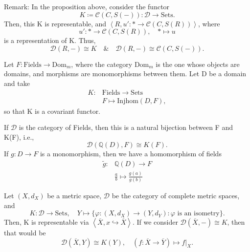 \documentclass[../category_theory.tex]{subfiles}
\begin{document}
Remark: In the proposition above, consider the functor
\[
	K\coloneqq \mathcal{C}(C, S(-)):\mathcal{D}\rightarrow \mathrm{Sets}.
\]
Then, this K is representable, and \(\left< R, u':*\rightarrow \mathcal{C}(C, S(R)) \right>\), where
\[
	u':*\rightarrow \mathcal{C}(C, S(R)),\quad *\mapsto u
\]
is a representation of K. Thus,
\[
	\mathcal{D}(R, -)\cong K \quad\&\quad \mathcal{D}(R, -)\cong \mathcal{C}(C, S(-)).
\]
\begin{example}
	Let \(F:\mathrm{Fields}\rightarrow \mathrm{Dom}_{m}\), where the category \(\mathrm{Dom}_{m}\) is the one whose objects are domains, and morphisms are monomorphisms between them. Let D be a domain and take
	\begin{align*}
		K: & \mathrm{Fields}\rightarrow \mathrm{Sets} \\
		   & F\mapsto \mathrm{Injhom}(D, F),
	\end{align*}
	so that K is a covariant functor.

	If \(\mathcal{D}\) is the category of Fields, then this is a natural bijection between F and K(F), i.e.,
	\[
		\mathcal{D}(\mathbb{Q}(D), F)\cong K(F).
	\]
	If \(g:D\rightarrow F\) is a monomorphism, then we have a homomorphism of fields
	\begin{align*}
		\tilde{g}: & \mathbb{Q}(D)\rightarrow F           \\
		           & \frac{a}{b}\mapsto \frac{g(a)}{g(b)}
	\end{align*}
\end{example}
\begin{example}
	Let \((X, d_X)\) be a metric space, \(\mathcal{D}\) be the category of complete metric spaces, and
	\[
		K:\mathcal{D}\rightarrow \mathrm{Sets},\quad Y\mapsto \{\varphi :(X, d_{X})\rightarrow (Y, d_{Y}): \varphi \text{ is an isometry}\}.
	\]
	Then, K is representable via \(\left< \overline{X}, x\hookrightarrow \overline{X} \right>\). If we consider \(\mathcal{D}(\overline{X}, -)\cong K\), then that would be
	\[
		\mathcal{D}(\overline{X}, Y)\cong K(Y),\quad (f:\overline{X}\rightarrow \overline{Y})\mapsto f|_X.
	\]
\end{example}
\end{document}
